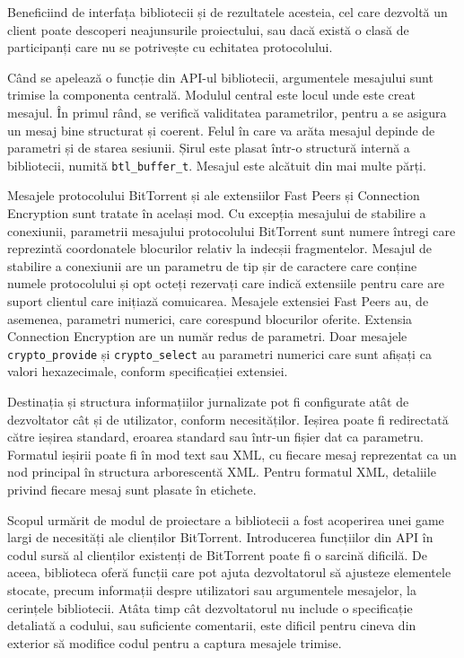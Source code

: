 Beneficiind de interfața bibliotecii și de rezultatele acesteia, cel care
dezvoltă un client poate descoperi neajunsurile proiectului, sau dacă există
o clasă de participanți care nu se potrivește cu echitatea protocolului.

Când se apelează o funcție din API-ul bibliotecii, argumentele mesajului sunt
trimise la componenta centrală. Modulul central este locul unde
este creat mesajul. În primul rând, se verifică validitatea parametrilor, pentru
a se asigura un mesaj bine structurat și coerent. Felul în care va arăta
mesajul depinde de parametri și de starea sesiunii. Șirul este plasat
într-o structură internă a bibliotecii, numită \texttt{btl\_buffer\_t}.
Mesajul este alcătuit din mai multe părți.

Mesajele protocolului BitTorrent și ale extensiilor Fast Peers și Connection
Encryption sunt tratate în același mod. Cu excepția mesajului de stabilire
a conexiunii, parametrii mesajului protocolului BitTorrent sunt numere întregi
care reprezintă coordonatele blocurilor relativ la indecșii fragmentelor.
Mesajul de stabilire a conexiunii are un parametru de tip șir de caractere
care conține numele protocolului și opt octeți rezervați care indică
extensiile pentru care are suport clientul care inițiază comuicarea. Mesajele
extensiei Fast Peers au, de asemenea, parametri numerici, care corespund
blocurilor oferite. Extensia Connection Encryption are un număr redus de
parametri. Doar mesajele \texttt{crypto\_provide} și \texttt{crypto\_select}
au parametri numerici care sunt afișați ca valori hexazecimale, conform
specificației extensiei.

Destinația și structura informațiilor jurnalizate pot fi configurate
atât de dezvoltator cât și de utilizator, conform necesităților. Ieșirea poate
fi redirectată către ieșirea standard, eroarea standard sau într-un fișier
dat ca parametru. Formatul ieșirii poate fi în mod text sau XML, cu fiecare
mesaj reprezentat ca un nod principal în structura arborescentă XML. Pentru
formatul XML, detaliile privind fiecare mesaj sunt plasate în etichete.

Scopul urmărit de modul de proiectare a bibliotecii a fost acoperirea unei
game largi de necesități ale clienților BitTorrent. Introducerea funcțiilor
din API în codul sursă al clienților existenți de BitTorrent poate fi o
sarcină dificilă. De aceea, biblioteca oferă funcții care pot ajuta
dezvoltatorul să ajusteze elementele stocate, precum informații despre
utilizatori sau argumentele mesajelor, la cerințele bibliotecii. Atâta timp cât
dezvoltatorul nu include o specificație detaliată a codului, sau suficiente
comentarii, este dificil pentru cineva din exterior să modifice codul pentru
a captura mesajele trimise.

